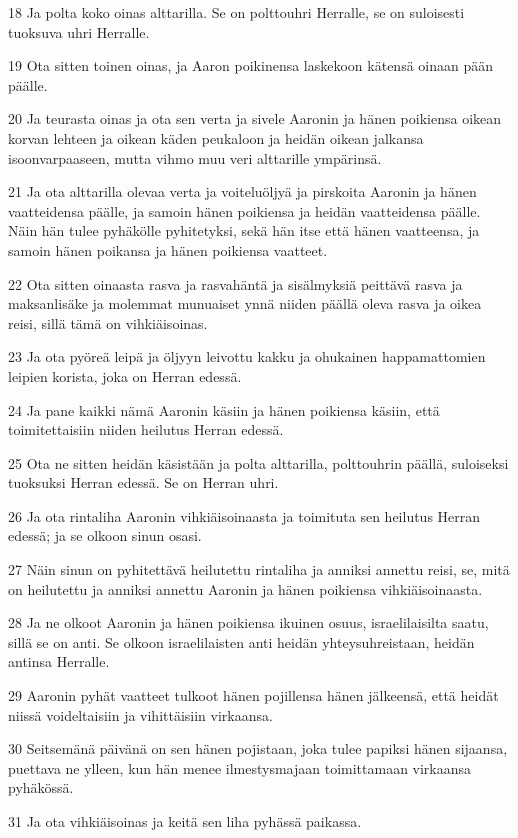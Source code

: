 \par 18 Ja polta koko oinas alttarilla. Se on polttouhri Herralle, se on suloisesti tuoksuva uhri Herralle.
\par 19 Ota sitten toinen oinas, ja Aaron poikinensa laskekoon kätensä oinaan pään päälle.
\par 20 Ja teurasta oinas ja ota sen verta ja sivele Aaronin ja hänen poikiensa oikean korvan lehteen ja oikean käden peukaloon ja heidän oikean jalkansa isoonvarpaaseen, mutta vihmo muu veri alttarille ympärinsä.
\par 21 Ja ota alttarilla olevaa verta ja voiteluöljyä ja pirskoita Aaronin ja hänen vaatteidensa päälle, ja samoin hänen poikiensa ja heidän vaatteidensa päälle. Näin hän tulee pyhäkölle pyhitetyksi, sekä hän itse että hänen vaatteensa, ja samoin hänen poikansa ja hänen poikiensa vaatteet.
\par 22 Ota sitten oinaasta rasva ja rasvahäntä ja sisälmyksiä peittävä rasva ja maksanlisäke ja molemmat munuaiset ynnä niiden päällä oleva rasva ja oikea reisi, sillä tämä on vihkiäisoinas.
\par 23 Ja ota pyöreä leipä ja öljyyn leivottu kakku ja ohukainen happamattomien leipien korista, joka on Herran edessä.
\par 24 Ja pane kaikki nämä Aaronin käsiin ja hänen poikiensa käsiin, että toimitettaisiin niiden heilutus Herran edessä.
\par 25 Ota ne sitten heidän käsistään ja polta alttarilla, polttouhrin päällä, suloiseksi tuoksuksi Herran edessä. Se on Herran uhri.
\par 26 Ja ota rintaliha Aaronin vihkiäisoinaasta ja toimituta sen heilutus Herran edessä; ja se olkoon sinun osasi.
\par 27 Näin sinun on pyhitettävä heilutettu rintaliha ja anniksi annettu reisi, se, mitä on heilutettu ja anniksi annettu Aaronin ja hänen poikiensa vihkiäisoinaasta.
\par 28 Ja ne olkoot Aaronin ja hänen poikiensa ikuinen osuus, israelilaisilta saatu, sillä se on anti. Se olkoon israelilaisten anti heidän yhteysuhreistaan, heidän antinsa Herralle.
\par 29 Aaronin pyhät vaatteet tulkoot hänen pojillensa hänen jälkeensä, että heidät niissä voideltaisiin ja vihittäisiin virkaansa.
\par 30 Seitsemänä päivänä on sen hänen pojistaan, joka tulee papiksi hänen sijaansa, puettava ne ylleen, kun hän menee ilmestysmajaan toimittamaan virkaansa pyhäkössä.
\par 31 Ja ota vihkiäisoinas ja keitä sen liha pyhässä paikassa.
